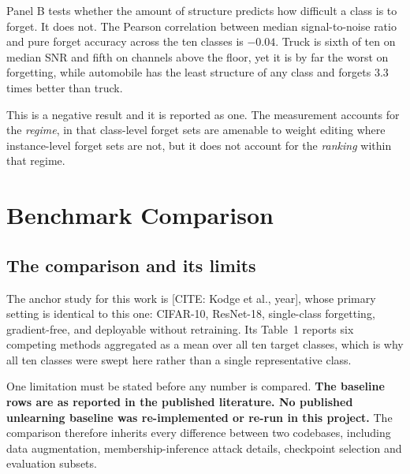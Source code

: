 Panel B tests whether the amount of structure predicts how difficult a class is to
forget. It does not. The Pearson correlation between median signal-to-noise ratio
and pure forget accuracy across the ten classes is $-0.04$. Truck is sixth of ten
on median SNR and fifth on channels above the floor, yet it is by far the worst on
forgetting, while automobile has the least structure of any class and forgets 3.3
times better than truck.

This is a negative result and it is reported as one. The measurement accounts for
the \emph{regime}, in that class-level forget sets are amenable to weight editing
where instance-level forget sets are not, but it does not account for the
\emph{ranking} within that regime.

\section{Benchmark Comparison}
\label{sec:exp-benchmark}

\subsection{The comparison and its limits}

The anchor study for this work is [CITE: Kodge et al., year], whose primary
setting is identical to this one: CIFAR-10, ResNet-18, single-class forgetting,
gradient-free, and deployable without retraining. Its Table~1 reports six
competing methods aggregated as a mean over all ten target classes, which is why
all ten classes were swept here rather than a single representative class.

One limitation must be stated before any number is compared. \textbf{The baseline
rows are as reported in the published literature. No published unlearning baseline
was re-implemented or re-run in this project.} The comparison therefore inherits
every difference between two codebases, including data augmentation,
membership-inference attack details, checkpoint selection and evaluation subsets.

\begin{table}[htbp]
  \centering
  \caption{Benchmark comparison, CIFAR-10 and ResNet-18, mean over all ten target
  classes. Rows marked as reported are transcribed from the anchor study and were
  not re-measured in this project. Rows marked as measured were produced by the
  harness described in this chapter.}
  \label{tab:benchmark}
\end{table}

